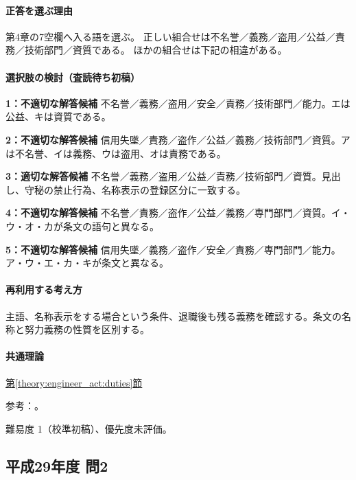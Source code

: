 \paragraph{正答を選ぶ理由} 第4章の7空欄へ入る語を選ぶ。 正しい組合せは不名誉／義務／盗用／公益／責務／技術部門／資質である。 ほかの組合せは下記の相違がある。

\paragraph{選択肢の検討（査読待ち初稿）}\mbox{}\par

\noindent\textbf{1：不適切な解答候補} 不名誉／義務／盗用／安全／責務／技術部門／能力。エは公益、キは資質である。\par

\noindent\textbf{2：不適切な解答候補} 信用失墜／責務／盗作／公益／義務／技術部門／資質。アは不名誉、イは義務、ウは盗用、オは責務である。\par

\noindent\textbf{3：適切な解答候補} 不名誉／義務／盗用／公益／責務／技術部門／資質。見出し、守秘の禁止行為、名称表示の登録区分に一致する。\par

\noindent\textbf{4：不適切な解答候補} 不名誉／責務／盗作／公益／義務／専門部門／資質。イ・ウ・オ・カが条文の語句と異なる。\par

\noindent\textbf{5：不適切な解答候補} 信用失墜／義務／盗作／安全／責務／専門部門／能力。ア・ウ・エ・カ・キが条文と異なる。\par

\paragraph{再利用する考え方} 主語、名称表示をする場合という条件、退職後も残る義務を確認する。条文の名称と努力義務の性質を区別する。

\paragraph{共通理論} \hyperref[theory:engineer_act:duties]{第\ref*{theory:engineer_act:duties}節}

\par 参考：\cite{engineer_act_current}。

\par 難易度 1（校準初稿）、優先度未評価。

\subsection{平成29年度 問2}
\label{q:h29-reg-apt-02}


